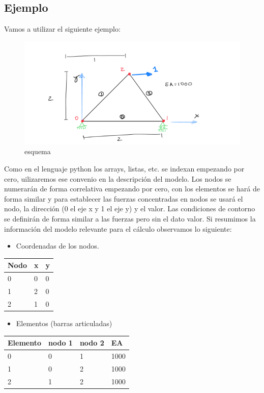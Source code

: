 \documentclass[11pt]{article}
\providecommand{\tightlist}{%
      \setlength{\itemsep}{0pt}\setlength{\parskip}{0pt}}
\begin{document}
    \hypertarget{ejemplo}{%
\subsection{Ejemplo}\label{ejemplo}}

Vamos a utilizar el siguiente ejemplo:

\begin{figure}
\centering
\includegraphics{esquema.png}
\caption{esquema}
\end{figure}

Como en el lenguaje python los arrays, listas, etc. se indexan empezando
por cero, uilizaremos ese convenio en la descripción del modelo. Los
nodos se numerarán de forma correlativa empezando por cero, con los
elementos se hará de forma similar y para establecer las fuerzas
concentradas en nodos se usará el nodo, la dirección (0 el eje x y 1 el
eje y) y el valor. Las condiciones de contorno se definirán de forma
similar a las fuerzas pero sin el dato valor. Si resumimos la
información del modelo relevante para el cálculo observamos lo
siguiente:

\begin{itemize}
\tightlist
\item
  Coordenadas de los nodos.
\end{itemize}

\begin{longtable}[]{@{}lll@{}}
\toprule
Nodo & x & y\tabularnewline
\midrule
\endhead
0 & 0 & 0\tabularnewline
1 & 2 & 0\tabularnewline
2 & 1 & 0\tabularnewline
\bottomrule
\end{longtable}

\begin{itemize}
\tightlist
\item
  Elementos (barras articuladas)
\end{itemize}

\begin{longtable}[]{@{}llll@{}}
\toprule
Elemento & nodo 1 & nodo 2 & EA\tabularnewline
\midrule
\endhead
0 & 0 & 1 & 1000\tabularnewline
1 & 0 & 2 & 1000\tabularnewline
2 & 1 & 2 & 1000\tabularnewline
\bottomrule
\end{longtable}
\end{document}
